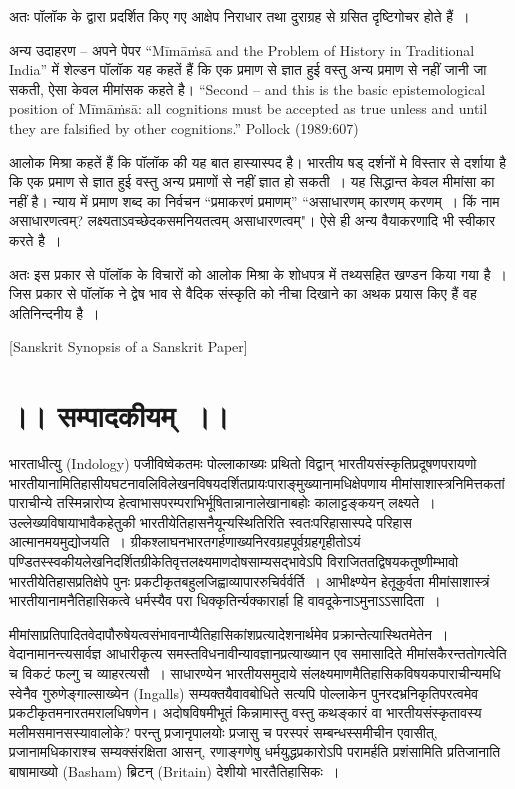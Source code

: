 अतः पॉलॉक के द्वारा प्रदर्शित किए गए आक्षेप निराधार तथा दुराग्रह से ग्रसित दृष्टिगोचर होते हैं~।

अन्य उदाहरण – अपने पेपर “Mīmāṁsā and the Problem of History in Traditional India” में शेल्डन पॉलॉक यह कहतें हैं कि एक प्रमाण से ज्ञात हुई वस्तु अन्य प्रमाण से नहीं जानी जा सकती, ऐसा केवल मीमांसक कहते है। “Second – and this is the basic epistemological position of Mīmāṁsā: all cognitions must be accepted as true unless and until they are falsified by other cognitions.” Pollock (1989:607)

आलोक मिश्रा कहतें हैं कि पॉलॉक की यह बात हास्यास्पद है। भारतीय षड् दर्शनों मे विस्तार से दर्शाया है कि एक प्रमाण से ज्ञात हुई वस्तु अन्य प्रमाणों से नहीं ज्ञात हो सकती~। यह सिद्धान्त केवल मीमांसा का नहीं है। न्याय में प्रमाण शब्द का निर्वचन “प्रमाकरणं प्रमाणम्” “असाधारणम् कारणम् करणम्~। किं नाम असाधारणत्वम्? लक्ष्यताऽवच्छेदकसमनियतत्वम् असाधारणत्वम्"। ऐसे ही अन्य वैयाकरणादि भी स्वीकार करते है~।

अतः इस प्रकार से पॉलॉक के विचारों को आलोक मिश्रा के शोधपत्र में तथ्यसहित खण्डन किया गया है~। जिस प्रकार से पॉलॉक ने द्वेष भाव से वैदिक संस्कृति को नीचा दिखाने का अथक प्रयास किए हैं वह अतिनिन्दनीय है~।

\begin{center}
[Sanskrit Synopsis of a Sanskrit Paper]
\end{center}

\section*{।। सम्पादकीयम्~।।}

भारताधीत्यु (Indology) पजीविष्वेकतमः पोल्लाकाख्यः प्रथितो विद्वान् भारतीयसंस्कृतिप्रदूषणपरायणो भारतीयानामितिहासीयघटनावलिविलेखनविषयदर्शितप्रायःपाराङ्मुख्यानामधिक्षेपणाय मीमांसाशास्त्रनिमित्तकतां पाराचीन्ये तस्मिन्नारोप्य हेत्वाभासपरम्पराभिर्भूषितान्नानालेखानाबहोः कालाट्टङ्कयन् लक्ष्यते~। उल्लेख्यविषायाभावैकहेतुकी भारतीयेतिहासनैयून्यस्थितिरिति स्वतःपरिहासास्पदे परिहास आत्मानमयमुद्योजयति~। ग्रीकश्लाघनभारतगर्हणाख्यनिरवग्रहपूर्वग्रहगृहीतोऽयं पण्डितस्स्वकीयलेखनिदर्शितग्रीकेतिवृत्तलक्ष्यमाणदोषसाम्यसद्भावेऽपि विराजिततद्विषयकतूष्णीम्भावो भारतीयेतिहासप्रतिक्षेपे पुनः प्रकटीकृतबहुलजिह्वाव्यापाररुचिर्वर्वर्ति~। आभीक्ष्ण्येन हेतूकुर्वता मीमांसाशास्त्रं भारतीयानामनैतिहासिकत्वे धर्मस्यैव परा धिक्कृतिर्न्यक्कारार्हा हि वावदूकेनाऽमुनाऽऽसादिता~।

मीमांसाप्रतिपादितवेदापौरुषेयत्वसंभावनाप्यैतिहासिकांशप्रत्यादेशनार्थमेव प्रक्रान्तेत्यास्थितमेतेन~। वेदानामानन्त्यसार्वज्ञ आधारीकृत्य समस्तविधनावीन्यावज्ञानप्रत्याख्यान एव समासादिते मीमांसकैरन्ततोगत्वेति च विकटं फल्गु च व्याहरत्यसौ~। साधारण्येन भारतीयसमुदाये संलक्ष्यमाणमैतिहासिकविषयकपाराचीन्यमधि स्वेनैव गुरुणेङ्गाल्साख्येन (Ingalls) सम्यक्तयैवावबोधिते सत्यपि पोल्लाकेन पुनरदभ्रनिकृतिपरत्वमेव प्रकटीकृतमनारतमरालधिषणेन। अदोषविषमीभूतं किन्नामास्तु वस्तु कथङ्कारं वा भारतीयसंस्कृतावस्य मलीमसमानसस्यावालोके? परन्तु प्रजानृपालयोः प्रजासु च परस्परं सम्बन्धस्समीचीन एवासीत्, प्रजानामधिकाराश्च सम्यक्संरक्षिता आसन्, रणाङ्गणेषु धर्मयुद्धप्रकारोऽपि परामर्हति प्रशंसामिति प्रतिजानाति बाषामाख्यो (Basham) ब्रिटन् (Britain) देशीयो भारतैतिहासिकः~।

